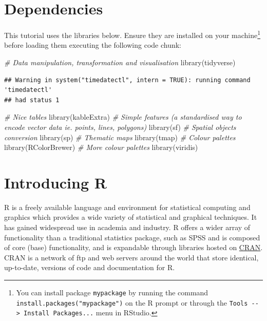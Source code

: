 \documentclass[
]{book}
\newenvironment{Shaded}{\begin{snugshade}}{\end{snugshade}}
\newcommand{\CommentTok}[1]{\textcolor[rgb]{0.56,0.35,0.01}{\textit{#1}}}
\newcommand{\FunctionTok}[1]{\textcolor[rgb]{0.00,0.00,0.00}{#1}}
\newcommand{\NormalTok}[1]{#1}
\begin{document}
\hypertarget{dependencies}{%
\section{Dependencies}\label{dependencies}}

This tutorial uses the libraries below. Ensure they are installed on your machine\footnote{You can install package \texttt{mypackage} by running the command \texttt{install.packages("mypackage")} on the R prompt or through the \texttt{Tools\ -\/-\textgreater{}\ Install\ Packages...} menu in RStudio.} before loading them executing the following code chunk:

\begin{Shaded}
\begin{Highlighting}[]
\CommentTok{\# Data manipulation, transformation and visualisation}
\FunctionTok{library}\NormalTok{(tidyverse)}
\end{Highlighting}
\end{Shaded}

\begin{verbatim}
## Warning in system("timedatectl", intern = TRUE): running command 'timedatectl'
## had status 1
\end{verbatim}

\begin{Shaded}
\begin{Highlighting}[]
\CommentTok{\# Nice tables}
\FunctionTok{library}\NormalTok{(kableExtra)}
\CommentTok{\# Simple features (a standardised way to encode vector data ie. points, lines, polygons)}
\FunctionTok{library}\NormalTok{(sf) }
\CommentTok{\# Spatial objects conversion}
\FunctionTok{library}\NormalTok{(sp) }
\CommentTok{\# Thematic maps}
\FunctionTok{library}\NormalTok{(tmap) }
\CommentTok{\# Colour palettes}
\FunctionTok{library}\NormalTok{(RColorBrewer) }
\CommentTok{\# More colour palettes}
\FunctionTok{library}\NormalTok{(viridis)}
\end{Highlighting}
\end{Shaded}

\hypertarget{introducing-r}{%
\section{Introducing R}\label{introducing-r}}

R is a freely available language and environment for statistical computing and graphics which provides a wide variety of statistical and graphical techniques. It has gained widespread use in academia and industry. R offers a wider array of functionality than a traditional statistics package, such as SPSS and is composed of core (base) functionality, and is expandable through libraries hosted on \href{https://cran.r-project.org}{CRAN}. CRAN is a network of ftp and web servers around the world that store identical, up-to-date, versions of code and documentation for R.
\end{document}
